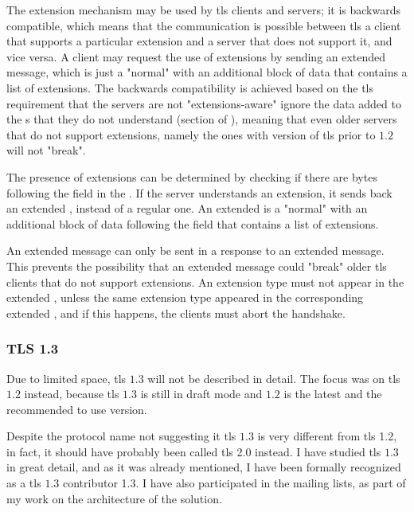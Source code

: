 \documentclass{llncs}
\begin{document}
The extension mechanism may be used by \gls{tls} clients and servers; it is backwards
compatible, which means that the communication is possible between \gls{tls} a
client that supports a particular extension and a server that does not support it,
and vice versa. A client may request the use of extensions by sending an extended 
message, which is just a "normal"  with an additional
block of data that contains a list of extensions. The backwards compatibility is achieved based on the \gls{tls}
requirement that the servers are not "extensions-aware" ignore the data
added to the s that they do not understand (section  of \cite{RFC2246}),
meaning that even older servers that do not support extensions, namely the ones with
version of \gls{tls} prior to $1.2$ will not "break".

The presence of extensions can be determined by checking if there are bytes
following the  field in the .
If the server understands an extension, it sends back an extended ,
instead of a regular one. An extended  is a "normal"
 with an additional block of data following the
 field that contains a list of extensions.

An extended  message can only be sent in a response to an
extended  message. This prevents the possibility that an extended
 message could "break" older \gls{tls} clients that do not
support extensions. An extension type must not appear in the
extended , unless the same extension type appeared in the
corresponding extended , and if this happens, the clients must abort the handshake.

\subsubsection{TLS 1.3}

Due to limited space, \gls{tls} $1.3$ will not be described in detail. The focus was on \gls{tls} $1.2$ instead, because \gls{tls} $1.3$ is still in draft
mode and $1.2$ is the latest and the recommended to use version.

Despite the protocol name not suggesting it \gls{tls} $1.3$ is
very different from \gls{tls} 1.2, in fact, it should have probably been called
\gls{tls} 2.0 instead. I have studied \gls{tls} $1.3$ in great detail, and as it was  already mentioned,
I have been formally recognized as a \gls{tls} $1.3$ contributor 1.3.
I have also participated in the mailing lists, as part of my work on the architecture of the solution.
\end{document}
